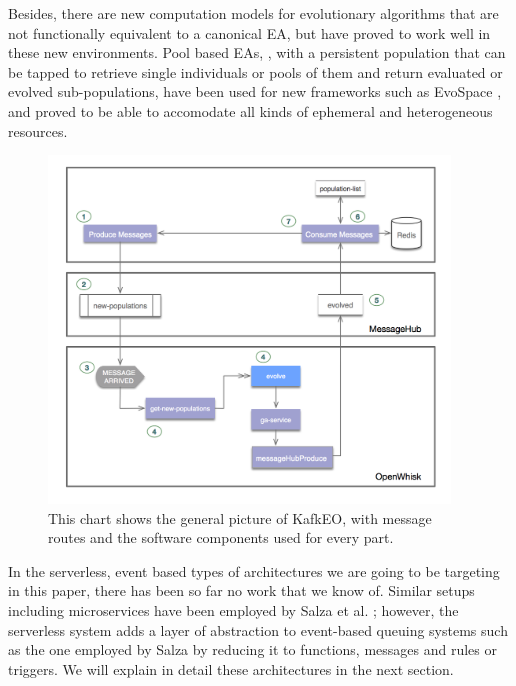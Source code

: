 \documentclass[sigconf]{acmart}
\begin{document}
Besides, there are new computation models for evolutionary algorithms
that are not functionally equivalent to a canonical EA, but have
proved to work well in these new environments. Pool based EAs,
\cite{bollini1999distributed}, with a persistent population that can
be tapped to retrieve single individuals or pools of them and return
evaluated or evolved sub-populations, have been used for new
frameworks such as EvoSpace \cite{García-Valdez2015}, and proved to be
able to accomodate all kinds of ephemeral and heterogeneous
resources. 

\begin{figure}[t!bp]
\includegraphics[width=0.95\textwidth]{img/kafka.png}
\caption{This chart shows the general picture of KafkEO, with message
  routes and the software components used for every part.}
\label{fig:kafkeo}
\end{figure}
%
In the serverless, event based types of architectures we are going to
be targeting in this paper, there has been so far no work that we know
of. Similar setups including microservices have been employed by Salza et
al. \cite{salza2017ccube}; however, the serverless system adds a layer
of abstraction to event-based queuing systems such as the one employed
by Salza by reducing it to functions, messages and rules or
triggers. We will explain in detail these architectures in the next
section.
\end{document}

